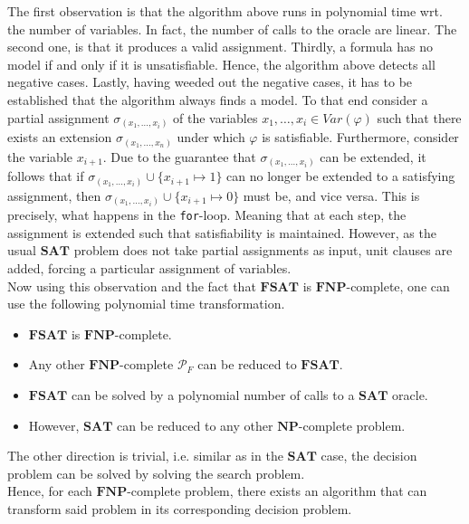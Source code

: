 \documentclass[11pt,a4paper]{article}
\newcommand{\NP}{\ensuremath{\mathbf{NP}}\xspace}
\begin{document}
\begin{enumerate}
\begin{enumerate}[(a)]
The first observation is that the algorithm above runs in polynomial time wrt. the number of variables. In fact, the number of calls to the oracle are linear. The second one, is that it produces a valid assignment. Thirdly, a formula has no model if and only if it is unsatisfiable. Hence, the algorithm above detects all negative cases. Lastly, having weeded out the negative cases, it has to be established that the algorithm always finds a model. To that end consider a partial assignment $\sigma_{(x_1, \dots , x_i)}$ of the variables $x_1, \dots , x_i \in \mathit{Var}(\varphi)$ such that there exists an extension $\sigma_{(x_1, \dots , x_n)}$ under which $\varphi$ is satisfiable. Furthermore, consider the variable $x_{i+1}$. Due to the guarantee that $\sigma_{(x_1, \dots , x_i)} $ can be extended, it follows that if $\sigma_{(x_1, \dots , x_i)} \cup \{x_{i+1} \mapsto 1\}$ can no longer be extended to a satisfying assignment, then $\sigma_{(x_1, \dots , x_i)} \cup \{x_{i+1} \mapsto 0\}$ must be, and vice versa. This is precisely, what happens in the \texttt{for}-loop. Meaning that at each step, the assignment is extended such that satisfiability is maintained. However, as the usual $\mathbf{SAT}$ problem does not take partial assignments as input, unit clauses are added, forcing a particular assignment of variables. \\


Now using this observation and the fact that $\mathbf{FSAT}$ is $\mathbf{FNP}$-complete, one can use the following polynomial time transformation.
\begin{itemize}
\item $\mathbf{FSAT}$ is $\mathbf{FNP}$-complete.
\item Any other $\mathbf{FNP}$-complete $\mathcal{P}_F$ can be reduced to $\mathbf{FSAT}$. 
\item $\mathbf{FSAT}$ can be solved by a polynomial number of calls to a $\mathbf{SAT}$ oracle.
\item However, $\mathbf{SAT}$ can be reduced to any other \NP-complete problem.
\end{itemize}
The other direction is trivial, i.e. similar as in the $\mathbf{SAT}$ case, the decision problem can be solved by solving the search problem.\\

Hence, for each $\mathbf{FNP}$-complete problem, there exists an algorithm that can transform said problem in its corresponding decision problem.\\


\end{enumerate}
\end{enumerate}
\end{document}
